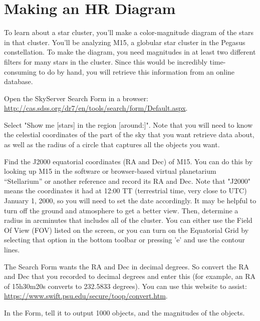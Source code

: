 \section{Making an HR Diagram}

To learn about a star cluster, you'll make a color-magnitude diagram of the stars in that cluster. You'll be analyzing M15, a globular star cluster in the Pegasus constellation. To make the diagram, you need magnitudes in at least two different filters for many stars in the cluster. Since this would be incredibly time-consuming to do by hand, you will retrieve this information from an online database.

\begin{steps}
	\item Open the SkyServer Search Form in a browser: \url{http://cas.sdss.org/dr7/en/tools/search/form/Default.aspx}.
	
	\item Select "Show me [stars] in the region [around:]". Note that you will need to know the celestial coordinates of the part of the sky that you want retrieve data about, as well as the radius of a circle that captures all the objects you want.
	
	\item Find the J2000 equatorial coordinates (RA and Dec) of M15. You can do this by looking up M15 in the software or browser-based virtual planetarium ``Stellarium'' or another reference and record its RA and Dec. Note that "J2000" means the coordinates it had at 12:00 TT (terrestrial time, very close to UTC) January 1, 2000, so you will need to set the date accordingly. It may be helpful to turn off the ground and atmosphere to get a better view. Then, determine a radius in arcminutes that includes all of the cluster. You can either use the Field Of View (FOV) listed on the screen, or you can turn on the Equatorial Grid by selecting that option in the bottom toolbar or pressing 'e' and use the contour lines.
	
	\item The Search Form wants the RA and Dec in decimal degrees. So convert the RA and Dec that you recorded to decimal degrees and enter this (for example, an RA of 15h30m20s converts to 232.5833 degrees). You can use this website to assist: \url{https://www.swift.psu.edu/secure/toop/convert.htm}.
	
	\item In the Form, tell it to output 1000 objects, and the magnitudes of the objects.
	

\end{steps}
